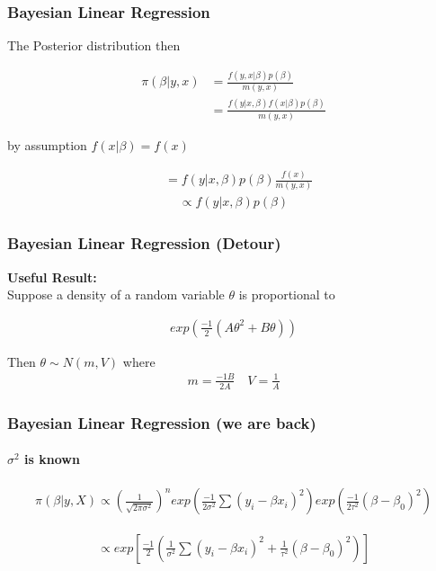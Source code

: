 \documentclass[
  shownotes,
  xcolor={svgnames},
  hyperref={colorlinks,citecolor=DarkBlue,linkcolor=DarkRed,urlcolor=DarkBlue}
  , aspectratio=169]{beamer}
\begin{document}
\begin{frame}[fragile]
\frametitle{Bayesian Linear Regression}
The Posterior distribution then 

\begin{align}
\pi (\beta|y,x) &= \frac{f(y,x|\beta)p(\beta)}{m(y,x)} \\
&= \frac{f(y|x,\beta)f(x|\beta)p(\beta)}{m(y,x)}
\end{align}

by assumption $f(x|\beta)=f(x)$

\begin{align}
&= f(y|x,\beta)p(\beta)\frac{f(x)}{m(y,x)}
\end{align}
\begin{align}
\propto f(y|x,\beta)p(\beta)
\end{align}

\end{frame}
\begin{frame}[fragile]
\frametitle{Bayesian Linear Regression (Detour)}
{\bf Useful Result:} \\

\bigskip
Suppose a density of a random variable $\theta$ is proportional to

\begin{align}
  exp\left(\frac{-1}{2}(A\theta^2+B\theta)\right)
\end{align}

Then $\theta\sim N(m,V)$ where
\begin{align}
m=\frac{-1B}{2A} \,\,\,\,\,\, V=\frac{1}{A}
\end{align}


\end{frame}
\begin{frame}[fragile]
\frametitle{Bayesian Linear Regression (we are back)}
\framesubtitle{$\sigma^2$ is known}

\begin{align}
\pi(\beta|y,X) \propto \left(\frac{1}{\sqrt{2\pi\sigma^2}}\right)^n exp\left(\frac{-1}{2\sigma^2}\sum(y_i-\beta x_i)^2\right)exp\left(\frac{-1}{2\tau^2}(\beta-\beta_0)^2\right)
\end{align}


\begin{align}
\propto  exp \left[ \frac{-1}{2} \left(\frac{1}{\sigma^2}\sum(y_i-\beta x_i)^2 + \frac{1}{\tau^2}(\beta-\beta_0)^2\right)\right]
\end{align}

\end{frame}
\end{document}

